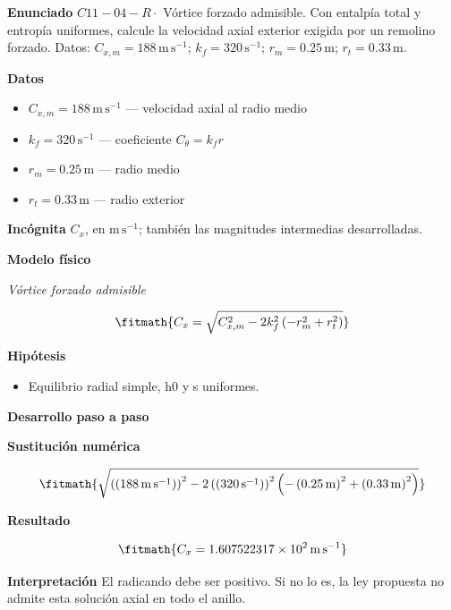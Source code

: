 \documentclass[10pt,openany]{book}
\begin{document}
\begin{tcolorbox}[title={Problema resuelto 4}, studiumworked, breakable]

\noindent\textbf{Enunciado}
\(C11-04-R \cdot\) Vórtice forzado admisible. Con entalpía total y entropía uniformes, calcule la velocidad axial exterior exigida por un remolino forzado. Datos: \(C_{x,m}=188\, \mathrm{m}\,\mathrm{s}^{-1}\); \(k_f=320\, \mathrm{s}^{-1}\); \(r_m=0.25\, \mathrm{m}\); \(r_t=0.33\, \mathrm{m}\).

\noindent\textbf{Datos}
\begin{itemize}
\item $C_{x,m} = 188\,\mathrm{m}\,\mathrm{s}^{-1}$ — velocidad axial al radio medio
\item $k_f = 320\,\mathrm{s}^{-1}$ — coeficiente $C_\theta=k_f r$
\item $r_m = 0.25\,\mathrm{m}$ — radio medio
\item $r_t = 0.33\,\mathrm{m}$ — radio exterior
\end{itemize}

\noindent\textbf{Incógnita}
$C_x$, en $\mathrm{m\,s^{-1}}$; también las magnitudes intermedias desarrolladas.

\noindent\textbf{Modelo físico}

\noindent\textit{Vórtice forzado admisible}

\[
\fitmath{C_x=\sqrt{C_{x,m}^{2} - 2 k_f^{2} \left(- r_m^{2} + r_t^{2}\right)}}
\]

\noindent\textbf{Hipótesis}
\begin{itemize}
\item Equilibrio radial simple, h0 y s uniformes.
\end{itemize}

\noindent\textbf{Desarrollo paso a paso}



\noindent\textbf{Sustitución numérica}

\[
\fitmath{\sqrt{\left(\left(188\,\mathrm{m}\,\mathrm{s}^{-1}\right)\right)^{2} - 2 \left(\left(320\,\mathrm{s}^{-1}\right)\right)^{2} \left(- \left(0.25\,\mathrm{m}\right)^{2} + \left(0.33\,\mathrm{m}\right)^{2}\right)}}
\]

\noindent\textbf{Resultado}

\[
\fitmath{C_x=1.607522317\times10^{2}\,\mathrm{m}\,\mathrm{s}^{-1}}
\]

\noindent\textbf{Interpretación}
El radicando debe ser positivo. Si no lo es, la ley propuesta no admite esta solución axial en todo el anillo.


\end{tcolorbox}
\end{document}
